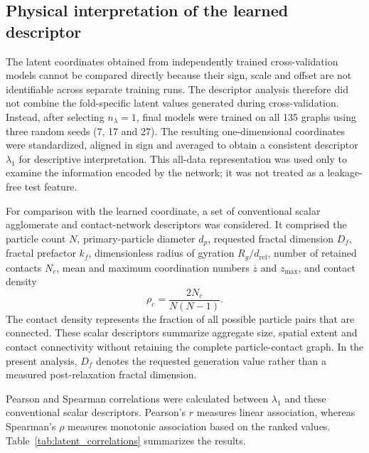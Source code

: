 \documentclass[12pt,a4paper]{article}
\begin{document}
\subsection{Physical interpretation of the learned descriptor}
\label{sec:latent_interpretation}

The latent coordinates obtained from independently trained cross-validation
models cannot be compared directly because their sign, scale and offset are not
identifiable across separate training runs. The descriptor analysis therefore
did not combine the fold-specific latent values generated during
cross-validation. Instead, after selecting $n_\lambda=1$, final models were
trained on all 135 graphs using three random seeds (7, 17 and 27). The resulting
one-dimensional coordinates were standardized, aligned in sign and averaged to
obtain a consistent descriptor $\lambda_1$ for descriptive interpretation.
This all-data representation was used only to examine the information encoded
by the network; it was not treated as a leakage-free test feature.

For comparison with the learned coordinate, a set of conventional scalar
agglomerate and contact-network descriptors was considered. It comprised the
particle count $N$, primary-particle diameter $d_p$, requested fractal
dimension $D_f$, fractal prefactor $k_f$, dimensionless radius of gyration
$R_g/d_{\mathrm{ref}}$, number of retained contacts $N_c$, mean and maximum
coordination numbers $\overline z$ and $z_{\max}$, and contact density
\begin{equation}
	\rho_c=\frac{2N_c}{N(N-1)}.
\end{equation}
The contact density represents the fraction of all possible particle pairs
that are connected. These scalar descriptors summarize aggregate size,
spatial extent and contact connectivity without retaining the complete
particle-contact graph. In the present analysis, $D_f$ denotes the requested
generation value rather than a measured post-relaxation fractal dimension.

Pearson and Spearman correlations were calculated between $\lambda_1$ and
these conventional scalar descriptors. Pearson's $r$ measures linear
association, whereas Spearman's $\rho$ measures monotonic association based on
the ranked values. Table~\ref{tab:latent_correlations} summarizes the results.
\end{document}
